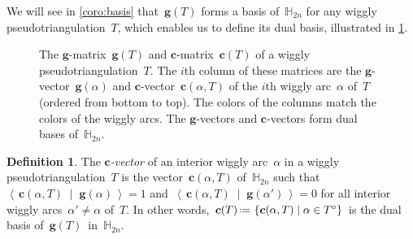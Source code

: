 \documentclass{amsart}
\theoremstyle{definition}
\newtheorem{definition}[theorem]{Definition}
\newcommand{\HH}{\mathbb{H}} %
\renewcommand{\b}[1]{{\boldsymbol{#1}}} %
\newcommand{\set}[2]{\left\{ #1 \;\middle|\; #2 \right\}} %
\newcommand{\dotprod}[2]{\left\langle \, #1 \; \middle| \; #2 \, \right\rangle} %
\newcommand{\eqdef}{\mbox{\,\raisebox{0.2ex}{\scriptsize\ensuremath{\mathrm:}}\ensuremath{=}\,}} %
\newcommand{\darkblue}{\color{darkblue}} %
\newcommand{\defn}[1]{\textsl{\darkblue #1}} %
\begin{document}
We will see in \cref{coro:basis} that~$\b{g}(T)$ forms a basis of~$\HH_{2n}$ for any wiggly pseudotriangulation~$T$, which enables us to define its dual basis, illustrated in \cref{fig:gcMatrices}.
%
\begin{figure}
\centerline{ \quad }
\caption{The $\b{g}$-matrix~$\b{g}(T)$ and $\b{c}$-matrix~$\b{c}(T)$ of a wiggly pseudotriangulation~$T$. The $i$th column of these matrices are the $\b{g}$-vector~$\b{g}(\alpha)$ and $\b{c}$-vector~$\b{c}(\alpha, T)$ of the $i$th wiggly arc~$\alpha$ of~$T$ (ordered from bottom to top). The colors of the columns match the colors of the wiggly arcs. The $\b{g}$-vectors and $\b{c}$-vectors form dual bases of~$\HH_{2n}$.}
\label{fig:gcMatrices}
\end{figure}

\begin{definition}
\label{def:cvectors}
The \defn{$\b{c}$-vector} of an interior wiggly arc~$\alpha$ in a wiggly pseudotriangulation~$T$ is the vector~$\b{c}(\alpha, T)$ of~$\HH_{2n}$ such that~$\dotprod{\b{c}(\alpha, T)}{\b{g}(\alpha)} = 1$ and~$\dotprod{\b{c}(\alpha, T)}{\b{g}(\alpha')} = 0$ for all interior wiggly arcs~$\alpha' \ne \alpha$ of~$T$.
In other words, $\b{c}(T) \eqdef \set{\b{c}(\alpha, T)}{\alpha \in T^\circ}$ is the dual basis of~$\b{g}(T)$~in~$\HH_{2n}$.
\end{definition}
\end{document}
